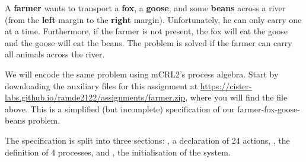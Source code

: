 \documentclass[11pt]{article}
\begin{document}
A \textbf{farmer} wants to transport a \textbf{fox}, a \textbf{goose}, and some \textbf{beans} across a river (from the \textbf{left} margin to the \textbf{right} margin).
Unfortunately, he can only carry one at a time. Furthermore, if the farmer is not present, the fox will eat the goose and the goose will eat the beans. The problem is solved if the farmer can carry all animals across the river.



\begin{myExercise} \label{ex:ba1}
We will encode the same problem using mCRL2's process algebra.
Start by downloading the auxiliary files for this assignment at \url{https://cister-labs.github.io/ramde2122/assignments/farmer.zip}, where you will find the  file above.
This is a simplified (but incomplete) specification of our farmer-fox-goose-beans problem.


The specification is split into three sections:
, a declaration of 24 actions,
, the definition of 4 processes, and
, the initialisation of the system.





\end{myExercise}

\end{document}
